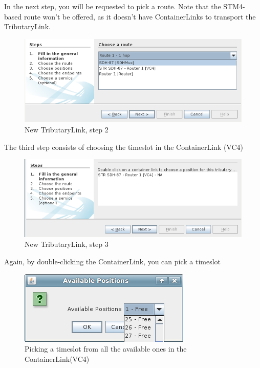 \documentclass[a4paper]{article}
\begin{document}
		In the next step, you will be requested to pick a route. Note that the STM4-based route won't be offered, as it doesn't have ContainerLinks to transport the TributaryLink.
		\begin{figure}[h!]
			\centering
			\includegraphics[width=\linewidth]{img/sdh_module_tributary_link_step_2.png}
			\caption{New TributaryLink, step 2}
			\label{fig:sdh_module_tributary_link_step_2}
		\end{figure}
		\newpage
		The third step consists of choosing the timeslot in the ContainerLink (VC4)
		\begin{figure}[h!]
			\centering
			\includegraphics[width=\linewidth]{img/sdh_module_tributary_link_step_3.png}
			\caption{New TributaryLink, step 3}
			\label{fig:sdh_module_tributary_link_step_3}
		\end{figure}

		Again, by double-clicking the ContainerLink, you can pick a timeslot
		\begin{figure}[h!]
			\centering
			\includegraphics[width=0.5\linewidth]{img/sdh_module_tributary_link_step_3_2.png}
			\caption{Picking a timeslot from all the available ones in the ContainerLink(VC4)}
			\label{fig:sdh_module_tributary_link_step_3_2}
		\end{figure}
		
\end{document}
